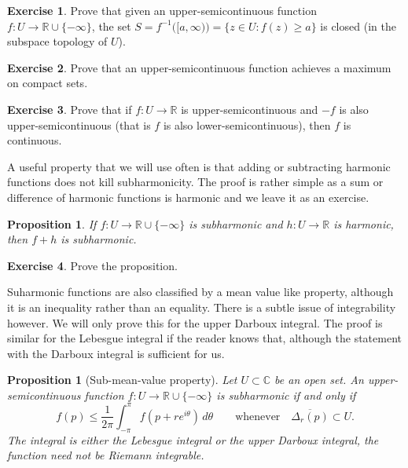 \documentclass[12pt,openany]{book}
\newcommand{\C}{{\mathbb{C}}}
\newcommand{\R}{{\mathbb{R}}}
\theoremstyle{plain}
\newtheorem{prop}[thm]{Proposition}
\theoremstyle{remark}
\theoremstyle{definition}
\newenvironment{exbox}{%
    \def\FrameCommand{\vrule width 1pt \relax\hspace {10pt}}%
    \MakeFramed {\advance \hsize -\width \FrameRestore }%
}{%
    \endMakeFramed
}
\theoremstyle{exercise}
\newtheorem{exercise}{Exercise}[section]
\theoremstyle{example}
\begin{document}
\begin{exbox}
\begin{exercise}
Prove that given an upper-semicontinuous function $f \colon U \to \R \cup
\{-\infty\}$,
the set $S = f^{-1}\bigl([a,\infty)\bigr) = \{ z \in U : f(z) \geq a \}$
is closed (in the subspace topology of $U$).
\end{exercise}

\begin{exercise}
Prove that an upper-semicontinuous function achieves a maximum on compact sets.
\end{exercise}

\begin{exercise}
Prove that if $f \colon U \to \R$ is upper-semicontinuous and $-f$ is also
upper-semicontinuous (that is $f$ is also lower-semicontinuous), then $f$
is continuous.
\end{exercise}
\end{exbox}

A useful property that we will use often is that adding or subtracting 
harmonic functions does not kill subharmonicity.  The proof is rather simple
as a sum or difference of harmonic functions is harmonic and we leave it as
an exercise.

\begin{prop} \label{prop:fplushsubharmonic}
If $f \colon U \to \R \cup \{ - \infty \}$ is subharmonic and $h \colon U
\to \R$ is harmonic, then $f+h$ is subharmonic.
\end{prop}

\begin{exbox}
\begin{exercise}
Prove the proposition.
\end{exercise}
\end{exbox}

Suharmonic functions are also classified by a mean value like property,
although it is an inequality rather than an equality.  There is a subtle
issue of integrability however.
We will only prove this for the upper Darboux integral.
The proof is 
similar for the Lebesgue integral if the reader knows that, although
the statement with the Darboux integral is sufficient for us.

\begin{prop}[Sub-mean-value property]
\label{prop:submeanprop}
Let $U \subset \C$ be an open set.
An upper-semicontinuous function $f \colon U \to \R \cup \{ -\infty \}$
is subharmonic if and only if
\begin{equation*}
f(p) \leq \frac{1}{2\pi} \int_{-\pi}^{\pi} f(p+re^{i\theta})\, d\theta
\qquad \text{whenever} \quad
\overline{\Delta_r(p)} \subset U .
\end{equation*}
The integral is either the Lebesgue integral or the upper Darboux integral,
the function need not be Riemann integrable.
\end{prop}
\end{document}
